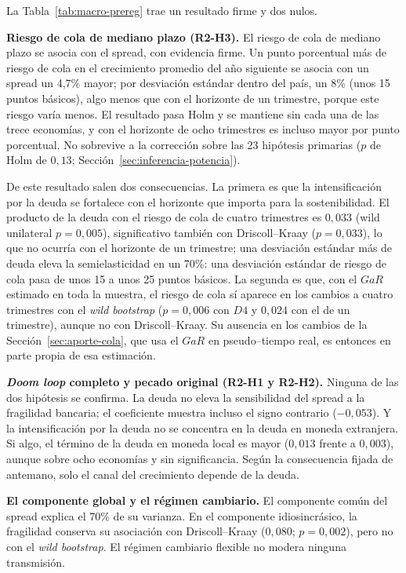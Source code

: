 La Tabla~\ref{tab:macro-prereg} trae un resultado firme y dos nulos.

\textbf{Riesgo de cola de mediano plazo (R2-H3).} El riesgo de cola de mediano plazo se asocia con el spread, con evidencia firme. Un punto porcentual más de riesgo de cola en el crecimiento promedio del año siguiente se asocia con un spread un 4,7\% mayor; por desviación estándar dentro del país, un 8\% (unos 15 puntos básicos), algo menos que con el horizonte de un trimestre, porque este riesgo varía menos. El resultado pasa Holm y se mantiene sin cada una de las trece economías, y con el horizonte de ocho trimestres es incluso mayor por punto porcentual. No sobrevive a la corrección sobre las 23 hipótesis primarias ($p$ de Holm de $0{,}13$; Sección~\ref{sec:inferencia-potencia}). 

De este resultado salen dos consecuencias. La primera es que la intensificación por la deuda se fortalece con el horizonte que importa para la sostenibilidad. El producto de la deuda con el riesgo de cola de cuatro trimestres es $0{,}033$ (wild unilateral $p=0{,}005$), significativo también con Driscoll--Kraay ($p=0{,}033$), lo que no ocurría con el horizonte de un trimestre; una desviación estándar más de deuda eleva la semielasticidad en un 70\%: una desviación estándar de riesgo de cola pasa de unos 15 a unos 25 puntos básicos. La segunda es que, con el $GaR$ estimado en toda la muestra, el riesgo de cola sí aparece en los cambios a cuatro trimestres con el \textit{wild bootstrap} ($p=0{,}006$ con $D4$ y $0{,}024$ con el de un trimestre), aunque no con Driscoll--Kraay. Su ausencia en los cambios de la Sección~\ref{sec:aporte-cola}, que usa el $GaR$ en pseudo--tiempo real, es entonces en parte propia de esa estimación.

\textbf{\textit{Doom loop} completo y pecado original (R2-H1 y R2-H2).} Ninguna de las dos hipótesis se confirma. La deuda no eleva la sensibilidad del spread a la fragilidad bancaria; el coeficiente muestra incluso el signo contrario ($-0{,}053$). Y la intensificación por la deuda no se concentra en la deuda en moneda extranjera. Si algo, el término de la deuda en moneda local es mayor ($0{,}013$ frente a $0{,}003$), aunque sobre ocho economías y sin significancia. Según la consecuencia fijada de antemano, solo el canal del crecimiento depende de la deuda.

\textbf{El componente global y el régimen cambiario.} El componente común del spread explica el 70\% de su varianza. En el componente idiosincrásico, la fragilidad conserva su asociación con Driscoll--Kraay ($0{,}080$; $p=0{,}002$), pero no con el \textit{wild bootstrap}. El régimen cambiario flexible no modera ninguna transmisión.

